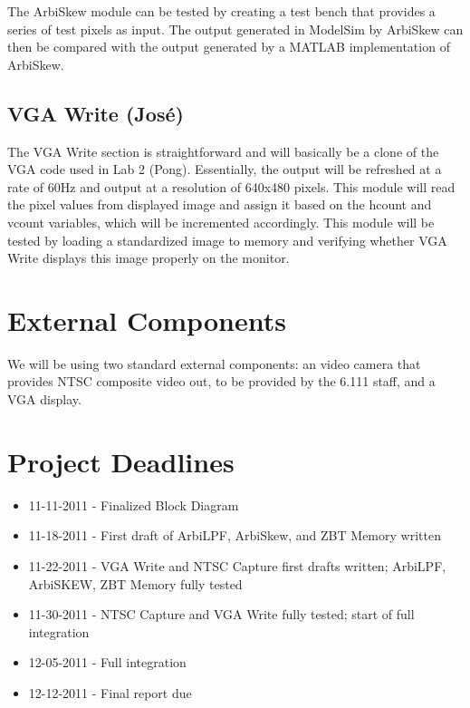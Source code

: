 \documentclass[10pt]{article}
\begin{document}
The ArbiSkew module can be tested by creating a test bench that provides a series of test pixels as input. The output generated in ModelSim by ArbiSkew can then be compared with the output generated by a MATLAB implementation of ArbiSkew.

\subsection{VGA Write (Jos\'{e})}
The VGA Write section is straightforward and will basically be a clone of the VGA code used in Lab 2 (Pong). Essentially, the output will be refreshed at a rate of 60Hz and output at a resolution of 640x480 pixels. This module will read the pixel values from displayed image and assign it based on the hcount and vcount variables, which will be incremented accordingly. This module will be tested by loading a standardized image to memory and verifying whether VGA Write displays this image properly on the monitor.

\section{External Components}
We will be using two standard external components: an video camera that provides NTSC composite video out, to be provided by the 6.111 staff, and a VGA display.

\section{Project Deadlines}
\begin{itemize}
\item 11-11-2011 - Finalized Block Diagram
\item 11-18-2011 - First draft of ArbiLPF, ArbiSkew, and ZBT Memory written
\item 11-22-2011 - VGA Write and NTSC Capture first drafts written; ArbiLPF, ArbiSKEW, ZBT Memory fully tested
\item 11-30-2011 - NTSC Capture and VGA Write fully tested; start of full integration
\item 12-05-2011 - Full integration
\item 12-12-2011 - Final report due
\end{itemize}
\end{document}
